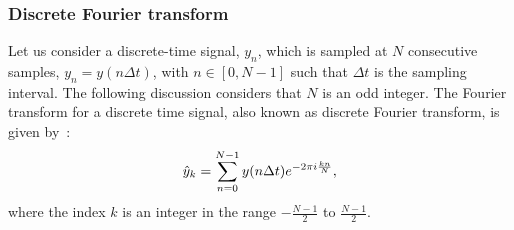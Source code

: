 \subsubsection*{Discrete Fourier transform} %
Let us consider a discrete-time signal, $y_n$, which is sampled at $N$ consecutive samples, $y_n = y(n \Delta t)$, with $n \in \left[0,N-1 \right ]$ such that $\Delta t$ is the sampling interval. The following discussion considers that $N$ is an odd integer. The Fourier transform for a discrete time signal, also known as discrete Fourier transform, is given by~\cite{a_numerical_recipies}:%
\begin{equation}\label{eq:DFT_definiton}
    \hat{y}_k= \sum_{n=0}^{N-1} y(n\Delta t) e^{-2\pi {i} \frac{k n}{N}},
\end{equation}
where the index $k$ is an integer in the range $-\frac{N-1}{2}$ to $\frac{N-1}{2}$.




